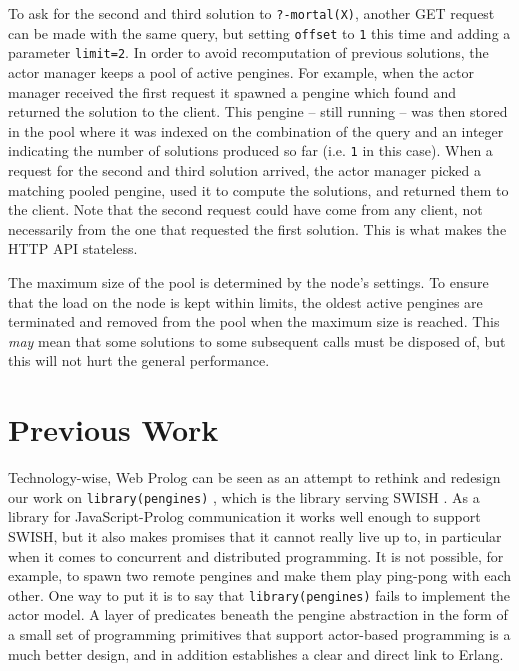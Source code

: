 \documentclass{tlp}
\begin{document}
To ask for the second and third solution to \texttt{?-mortal(X)}, another GET request can be made with the same query, but setting \texttt{offset} to \texttt{1} this time and adding a parameter \texttt{limit=2}. In order to avoid recomputation of previous solutions, the actor manager keeps a pool of active pengines. For example, when the actor manager received the first request it spawned a pengine which found and returned the solution to the client. This pengine -- still running -- was then stored in the pool where it was indexed on the combination of the query and an integer indicating the number of solutions produced so far (i.e. \texttt{1} in this case). When a request for the second and third solution arrived, the actor manager picked a matching pooled pengine, used it to compute the solutions, and returned them to the client. Note that the second request could have come from any client, not necessarily from the one that requested the first solution. This is what makes the HTTP API stateless.

The maximum size of the pool is determined by the node's settings. To ensure that the load on the node is kept within limits, the oldest active pengines are terminated and removed from the pool when the maximum size is reached. This \textit{may} mean that some solutions to some subsequent calls must be disposed of, but this will not hurt the general performance.


\section{Previous Work}\label{sec:previous}

Technology-wise, Web Prolog can be seen as an attempt to rethink and redesign our work on \texttt{library(pengines)} \cite{DBLP:journals/tplp/LagerW14}, which is the library serving SWISH \cite{DBLP:journals/corr/abs-1808-08042}. As a library for JavaScript-Prolog communication it works well enough to support SWISH, but it also makes promises that it cannot really live up to, in particular when it comes to concurrent and distributed programming. It is not possible, for example, to spawn two remote pengines and make them play ping-pong with each other. One way to put it is to say that \texttt{library(pengines)} fails to implement the actor model. %
A layer of predicates beneath the pengine abstraction in the form of a small set of programming primitives that support actor-based programming is a much better design, and in addition establishes a clear and direct link to Erlang.
\end{document}
